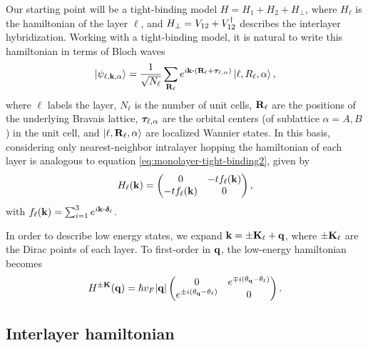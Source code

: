 Our starting point will be a tight-binding model $ H = H_1 + H_2 + H_{\perp} $, where $H_\ell$ is the hamiltonian of the layer $\ell$, and $H_\perp = V_{12} + V_{12}^{\dagger}$ describes the interlayer hybridization. Working with a tight-binding model, it is natural to write this hamiltonian in terms of Bloch waves
\begin{equation} \label{eq:BM-blochwave}
\ket{\psi_{\ell, \k, \alpha}} = \frac{1}{\sqrt{N_\ell}} \sum_{\R_\ell} e^{i \k \vdot (\R_\ell + \vtau_{\ell,\alpha})} \ket{\ell, R_\ell, \alpha},
\end{equation}
where $\ell$ labels the layer, $N_\ell$ is the number of unit cells, ${\vb{R}}_\ell$ are the positions of the underlying Bravais lattice, ${\bm{\tau}}_{\ell,\alpha}$ are the orbital centers (of sublattice $\alpha = A,B$) in the unit cell, and $\ket{\ell,{\vb{R}}_\ell,\alpha}$ are localized Wannier states. In this basis, considering only nearest-neighbor intralayer hopping the hamiltonian of each layer is analogous to equation \ref{eq:monolayer-tight-binding2}, given by
\begin{equation} \label{eq:blg-eachlayer-hamil}
H_\ell({\vb{k}}) =
\begin{pmatrix}
0 & -t f_\ell({\vb{k}}) \\
-t f_\ell({\vb{k}}) & 0
\end{pmatrix},
\end{equation}
with $f_\ell(\k) = \sum_{i=1}^{3} e^{i\k \vdot \vdelta_\ell}$.

In order to describe low energy states, we expand ${\vb{k}} = \pm {\vb{K}}_\ell + {\vb{q}}$, where $\pm {\vb{K}}_\ell$ are the Dirac points of each layer. To first-order in ${\vb{q}}$, the low-energy hamiltonian becomes
\begin{equation} \label{eq:blg-eachlayer-hamil-lowenergy}
H^{\pm {\vb{K}}}({\vb{q}}) = \hbar v_F \abs{{\vb{q}}}
\begin{pmatrix}
0 & e^{\mp i (\theta_{\vb{q}} - \theta_\ell)} \\
e^{\pm i (\theta_{\vb{q}} - \theta_\ell)} & 0
\end{pmatrix}.
\end{equation}


\subsection{Interlayer hamiltonian}

